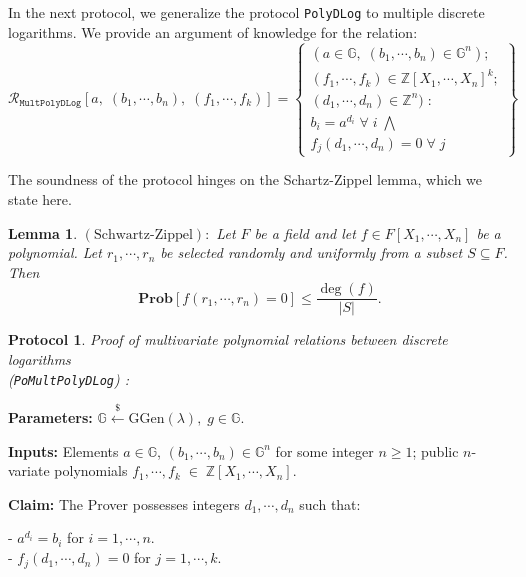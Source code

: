 \documentclass[11pt, lettersize, notitlepage, leqno, footskip=0.6cm]{article}
\newcommand{\bz}{\mathbb Z}
\newcommand{\ttt}{\texttt}
\newcommand{\mc}{\mathcal}
\newcommand{\mb}{\mathbb}
\newcommand{\mbf}{\mathbf}
\newcommand{\mr}{\mathrm}
\newcommand{\lamb}{\lambda}
\newcommand{\sub}{\subseteq}
\newcommand{\noin}{\noindent}
\newtheorem{Lem}[Thm]{Lemma}
\newtheorem{Prot}[Thm]{Protocol}
\numberwithin{equation}{section}
\begin{document}
\bigskip

In the next protocol, we generalize the protocol \verb|PolyDLog| to multiple discrete logarithms. We provide an argument of knowledge for the relation: 
\[
  \mc{R}_{\ttt{MultPolyDLog}}[a,\; (b_1,\cdots, b_n),\; (f_1,\cdots,f_k)] = \left\{\begin{array}{l}
    (a\in\mb{G},\; (b_1,\cdots, b_n)\in\mb{G}^n);\\
    (f_1,\cdots,f_k)\in\bz[X_1,\cdots,X_n]^k;\\ 
    (d_1,\cdots,d_n)\in\bz^n)\;: \\
    b_i = a^{d_i}\;\forall\; i\;\bigwedge \;\\   f_j(d_1,\cdots,d_n) = 0\;\forall\; j 
  \end{array}\right\}
\] 

\noin The soundness of the protocol hinges on the Schartz-Zippel lemma, which we state here.

\begin{Lem} $\mr{(Schwartz\text{-}Zippel)}:$ Let $F$ be a field and let $f\in F[X_1,\cdots,X_n]$ be a polynomial. Let $r_1,\cdots,r_n$ be selected randomly and uniformly from a subset $S\sub F$. Then \vspace{-0.1cm}$$\mbf{Prob}[f(r_1,\cdots, r_n) = 0] \leq \frac{\deg(f)}{|S|}.$$\end{Lem}




\begin{Prot} \normalfont \textit{Proof of multivariate polynomial relations between discrete logarithms}\\ (\verb|PoMultPolyDLog|) :\end{Prot} \vspace{-0.3cm}

\noindent \textbf{Parameters:} $\mb{G}\xleftarrow{\$} \mr{GGen}(\lamb), \; g\in \mb{G}$.

\noindent \textbf{Inputs:} Elements $a\in\mb{G} $, $(b_1,\cdots,b_n)\in \mb{G}^n$ for some integer $n\geq 1$; public $n$-variate polynomials $f_1,\cdots,f_k\;\in\; \bz[X_1,\cdots,X_n]$.

\noindent \textbf{Claim:} The Prover possesses integers $d_1,\cdots, d_n$ such that:

\noindent- $a^{d_i} = b_i$ for $i = 1,\cdots, n$.\\
- $f_j(d_1,\cdots,d_n) = 0$ for $j = 1,\cdots, k$.
\end{document}
